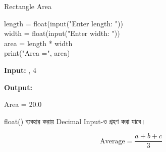 \begin{codeoutputbox}{Rectangle Area}

\noindent
\begin{minipage}[t]{0.58\linewidth}
\codeheading

\begin{english}
\ttfamily
length = float(input("Enter length: "))\\
width = float(input("Enter width: "))\\[0.5mm]
area = length * width\\
print("Area =", area)
\end{english}

\end{minipage}
\hfill
\begin{minipage}[t]{0.38\linewidth}
\outputheading

\textbf{Input:}
\textenglish{, 4}

\medskip

\textbf{Output:}

\textenglish{\ttfamily Area = 20.0}

\medskip

\textenglish{\ttfamily float()}
ব্যবহার করায় Decimal Input-ও গ্রহণ করা যাবে।

\end{minipage}

\end{codeoutputbox}



\[
\text{Average}=\frac{a+b+c}{3}
\]

